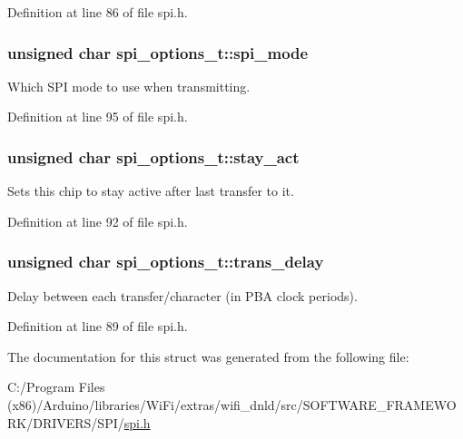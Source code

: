 Definition at line 86 of file spi.\+h.

\hypertarget{structspi__options__t_a98a1b706e726c41dfb40c2b67719e722}{}
\subsubsection[{spi\+\_\+mode}]{\setlength{\rightskip}{0pt plus 5cm}unsigned char spi\+\_\+options\+\_\+t\+::spi\+\_\+mode}\label{structspi__options__t_a98a1b706e726c41dfb40c2b67719e722}


Which S\+P\+I mode to use when transmitting. 



Definition at line 95 of file spi.\+h.

\hypertarget{structspi__options__t_a7c76c05bc4b82544aabe1d71e68baef1}{}
\subsubsection[{stay\+\_\+act}]{\setlength{\rightskip}{0pt plus 5cm}unsigned char spi\+\_\+options\+\_\+t\+::stay\+\_\+act}\label{structspi__options__t_a7c76c05bc4b82544aabe1d71e68baef1}


Sets this chip to stay active after last transfer to it. 



Definition at line 92 of file spi.\+h.

\hypertarget{structspi__options__t_aee521fc57eda6597539edb8d4dff56eb}{}
\subsubsection[{trans\+\_\+delay}]{\setlength{\rightskip}{0pt plus 5cm}unsigned char spi\+\_\+options\+\_\+t\+::trans\+\_\+delay}\label{structspi__options__t_aee521fc57eda6597539edb8d4dff56eb}


Delay between each transfer/character (in P\+B\+A clock periods). 



Definition at line 89 of file spi.\+h.



The documentation for this struct was generated from the following file\+:\begin{DoxyCompactItemize}
\item 
C\+:/\+Program Files (x86)/\+Arduino/libraries/\+Wi\+Fi/extras/wifi\+\_\+dnld/src/\+S\+O\+F\+T\+W\+A\+R\+E\+\_\+\+F\+R\+A\+M\+E\+W\+O\+R\+K/\+D\+R\+I\+V\+E\+R\+S/\+S\+P\+I/\hyperlink{spi_8h}{spi.\+h}\end{DoxyCompactItemize}
